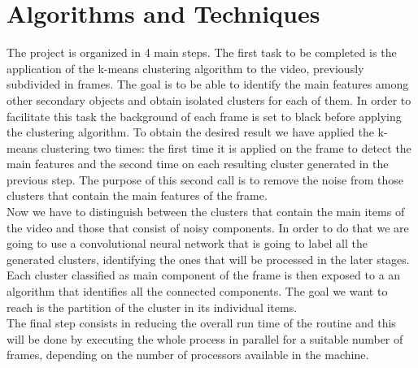 \documentclass{article}
\begin{document}
{\section{Algorithms and Techniques}
The project is organized in 4 main steps. The first task to be completed is the application of the k-means clustering algorithm to the video, previously subdivided in frames. The goal is to be able to identify the main features among other secondary objects and obtain isolated clusters for each of them. In order to facilitate this task the background of each frame is set to black before applying the clustering algorithm. To obtain the desired result we have applied the k-means clustering two times: the first time it is applied on the frame to detect the main features and the second time on each resulting cluster generated in the previous step. The purpose of this second call is to remove the noise from those clusters that contain the main features of the frame. \\
Now we have to distinguish between the clusters that contain the main items of the video and those that consist of noisy components. In order to do that we are going to use a convolutional neural network that is going to label all the generated clusters, identifying the ones that will be processed in the later stages. \\
Each cluster classified as main component of the frame is then exposed to a an algorithm that identifies all the connected components. The goal we want to reach is the partition of the cluster in its individual items.  \\
The final step consists in reducing the overall run time of the routine and this will be done by executing the whole process in parallel for a suitable number of frames, depending on the number of processors available in the machine.
}
\end{document}
